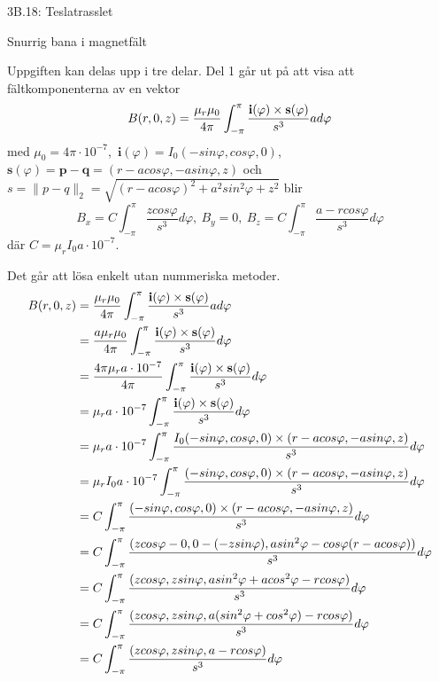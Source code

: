 \documentclass[a4paper]{article}
\begin{document}
\centerline{\sc \large 3B.18: Teslatrasslet}
\vspace{.5pc}
\centerline{\sc Snurrig bana i magnetfält}
\vspace{2pc}

Uppgiften kan delas upp i tre delar. Del 1 går ut på att visa att
fältkomponenterna av en vektor 
$$
B(r, 0, z) = \frac{\mu_r\mu_0}{4\pi} \int_{-\pi}^\pi
\frac{\bf{i}(\varphi)\times\bf{s}(\varphi)}{s^3}ad\varphi
$$
med $\mu_0 = 4\pi \cdot 10^{-7}$,\ $\mathbf{i}(\varphi) = I_0(-sin\varphi,
cos\varphi, 0)$,\ $\mathbf{s}(\varphi) = \mathbf{p} - \mathbf{q} = (r -
acos\varphi, -asin\varphi, z)$ och $s = \|p - q\|_2 = \sqrt{(r - acos\varphi)^2
+ a^2sin^2\varphi + z^2}$ blir
$$
B_x = C\int_{-\pi}^\pi \frac{zcos\varphi}{s^3}d\varphi, \
B_y = 0,\
B_z = C\int_{-\pi}^\pi \frac{a - rcos\varphi}{s^3}d\varphi 
$$
där $C = \mu_rI_0a \cdot 10^{-7}$.

\vspace{1pc}
Det går att lösa enkelt utan nummeriska metoder. 
\begin{eqnarray*}
  B(r, 0, z) & = \frac{\mu_r\mu_0}{4\pi} \int_{-\pi}^\pi
  \frac{\bf{i}(\varphi)\times\bf{s}(\varphi)}{s^3}ad\varphi \\
  & = \frac{a\mu_r\mu_0}{4\pi} \int_{-\pi}^\pi
  \frac{\bf{i}(\varphi)\times\bf{s}(\varphi)}{s^3}d\varphi \\
  & = \frac{4\pi\mu_ra \cdot 10^{-7}}{4\pi} \int_{-\pi}^\pi 
  \frac{\bf{i}(\varphi)\times\bf{s}(\varphi)}{s^3}d\varphi \\
  & = \mu_ra \cdot 10^{-7} \int_{-\pi}^\pi
  \frac{\bf{i}(\varphi)\times\bf{s}(\varphi)}{s^3}d\varphi \\
  & = \mu_ra \cdot 10^{-7} \int_{-\pi}^\pi
  \frac{I_0(-sin\varphi, cos\varphi, 0)\times(r - acos\varphi, -asin\varphi,
  z)}{s^3}d\varphi \\
  & = \mu_rI_0a \cdot 10^{-7} \int_{-\pi}^\pi
  \frac{(-sin\varphi, cos\varphi, 0)\times(r - acos\varphi, -asin\varphi,
  z)}{s^3}d\varphi \\
  & = C \int_{-\pi}^\pi
  \frac{(-sin\varphi, cos\varphi, 0)\times(r - acos\varphi, -asin\varphi,
  z)}{s^3}d\varphi \\
  & = C \int_{-\pi}^\pi
  \frac{(zcos\varphi - 0, 0 - (-zsin\varphi), asin^2\varphi - cos\varphi(r -
  acos\varphi))}{s^3}d\varphi \\
  & = C \int_{-\pi}^\pi
  \frac{(zcos\varphi, zsin\varphi, asin^2\varphi + acos^2\varphi - rcos\varphi)}{s^3}d\varphi \\
  & = C \int_{-\pi}^\pi
  \frac{(zcos\varphi, zsin\varphi, a(sin^2\varphi + cos^2\varphi) - rcos\varphi)}{s^3}d\varphi \\
  & = C \int_{-\pi}^\pi
  \frac{(zcos\varphi, zsin\varphi, a - rcos\varphi)}{s^3}d\varphi \\
\end{eqnarray*}
\end{document}
